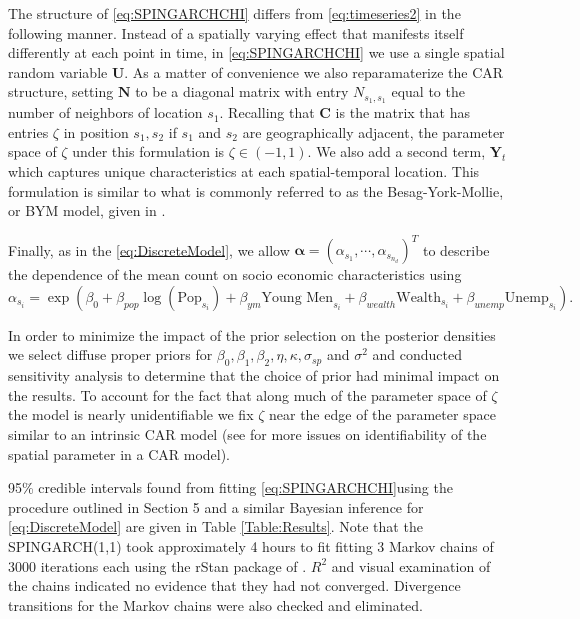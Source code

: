 \documentclass[11pt]{isuthesis}
\begin{document}
The structure of \eqref{eq:SPINGARCHCHI} differs from \eqref{eq:timeseries2} in the following manner.  Instead of a spatially varying effect that manifests itself differently at each point in time, in \eqref{eq:SPINGARCHCHI} we use a single spatial random variable $\boldsymbol{U}$.  As a matter of convenience we also reparamaterize the CAR structure, setting $\boldsymbol{N}$ to be a diagonal matrix with entry $N_{s_1,s_1}$ equal to the number of neighbors of location $s_1$.  Recalling that $\boldsymbol{C}$ is the matrix that has entries $\zeta$ in position $s_1,s_2$ if $s_1$ and $s_2$ are geographically adjacent, the parameter space of $\zeta$ under this formulation is $\zeta \in (-1,1)$.  We also add a second term, $\boldsymbol{Y}_t$ which captures unique characteristics at each spatial-temporal location.  This formulation is similar to what is commonly referred to as the Besag-York-Mollie, or BYM model, given in \cite{besag1991bayesian}.

Finally, as in the \eqref{eq:DiscreteModel}, we allow $\boldsymbol{\alpha}=(\alpha_{s_1},\cdots,\alpha_{s_{n_d}})^T$ to describe the dependence of the mean count on socio economic characteristics using
\begin{equation}
	\alpha_{s_i}=\exp\left(\beta_0+\beta_{pop} \log(\mbox{Pop}_{s_i})+\beta_{ym}\mbox{Young Men}_{s_i}+\beta_{wealth}\mbox{Wealth}_{s_i}+\beta_{unemp}\mbox{Unemp}_{s_i}\right).
\end{equation}

In order to minimize the impact of the prior selection on the posterior densities we select diffuse proper priors for $\beta_0,\beta_1,\beta_2,\eta,\kappa,\sigma_{sp}$ and $\sigma^2$ and conducted sensitivity analysis to determine that the choice of prior had minimal impact on the results. To account for the fact that along much of the parameter space of $\zeta$ the model is nearly unidentifiable we fix $\zeta$ near the edge of the parameter space similar to an intrinsic CAR model (see \cite{wall2004close} for more issues on identifiability of the spatial parameter in a CAR model).

95\% credible intervals found from fitting \eqref{eq:SPINGARCHCHI}using the procedure outlined in Section 5 and a similar Bayesian inference for \eqref{eq:DiscreteModel} are given in Table \ref{Table:Results}.  Note that the SPINGARCH(1,1) took approximately 4 hours to fit fitting 3 Markov chains of 3000 iterations each using the rStan package of \cite{carpenter2016stan}.  $R^2$ and visual examination of the chains indicated no evidence that they had not converged.  Divergence transitions for the Markov chains were also checked and eliminated.
\end{document}

